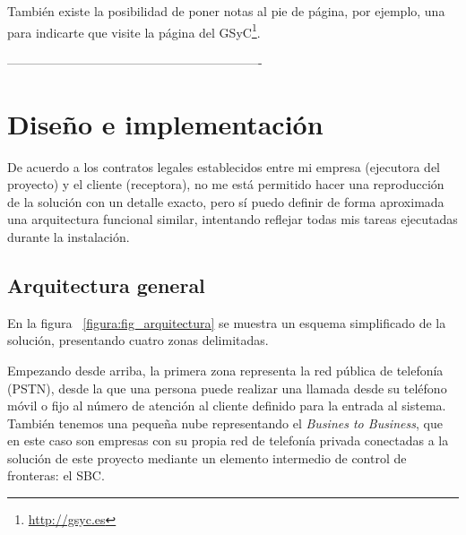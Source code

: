 \documentclass[a4paper, 12pt]{book}
\begin{document}
También existe la posibilidad de poner notas al pie de página, por ejemplo, una para indicarte que visite la página del GSyC\footnote{\url{http://gsyc.es}}.


-------------------------------------------------------------



\cleardoublepage
\chapter{Diseño e implementación}

De acuerdo a los contratos legales establecidos entre mi empresa (ejecutora del proyecto) y el cliente (receptora), no me está permitido hacer una reproducción de la solución con un detalle exacto, pero sí puedo definir de forma aproximada una arquitectura funcional similar, intentando reflejar todas mis tareas ejecutadas durante la instalación.

\section{Arquitectura general}
\label{sec:arquitectura}

En la figura ~\ref{figura:fig_arquitectura} se muestra un esquema simplificado de la solución, presentando cuatro zonas delimitadas. 

Empezando desde arriba, la primera zona representa la red pública de telefonía (PSTN), desde la que una persona puede realizar una llamada desde su teléfono móvil o fijo al número de atención al cliente definido para la entrada al sistema. También tenemos una pequeña nube representando el \emph{Busines to Business}, que en este caso son empresas con su propia red de telefonía privada conectadas a la solución de este proyecto mediante un elemento intermedio de control de fronteras: el SBC.
\end{document}
